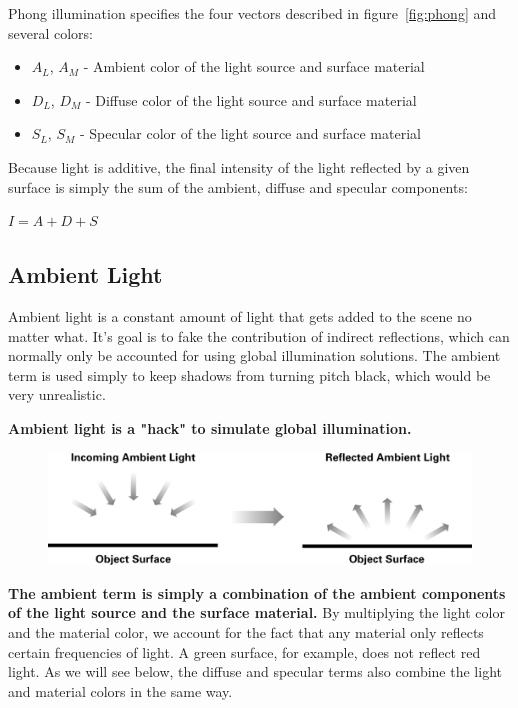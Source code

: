\documentclass{mini}
\begin{document}
Phong illumination specifies the four vectors described in figure~\ref{fig:phong} and several colors:

\begin{itemize}
    \item $A_L$, $A_M$ - Ambient color of the light source and surface material
    \item $D_L$, $D_M$ - Diffuse color of the light source and surface material
    \item $S_L$, $S_M$ - Specular color of the light source and surface material
\end{itemize}

Because light is additive, the final intensity of the light reflected by a given surface is simply the sum of the ambient, diffuse and specular components:
\begin{center}
    $I = A + D + S$
\end{center}



\subsection{Ambient Light}
Ambient light is a constant amount of light that gets added to the scene no matter what. It's goal is to fake the contribution of indirect reflections, which can normally only be accounted for using global illumination solutions. The ambient term is used simply to keep shadows from turning pitch black, which would be very unrealistic.

{\bf Ambient light is a "hack" to simulate global illumination.}



\begin{figure}[H]
    \centering
    \includegraphics[width=1.0\textwidth]{./images/ambient_light.jpg}
    \caption{}
    \label{fig:ambient}
\end{figure}

{\bf The ambient term is simply a combination of the ambient components of the light source and the surface material.} By multiplying the light color and the material color, we account for the fact that any material only reflects certain frequencies of light. A green surface, for example, does not reflect red light. As we will see below, the diffuse and specular terms also combine the light and material colors in the same way.
\end{document}
